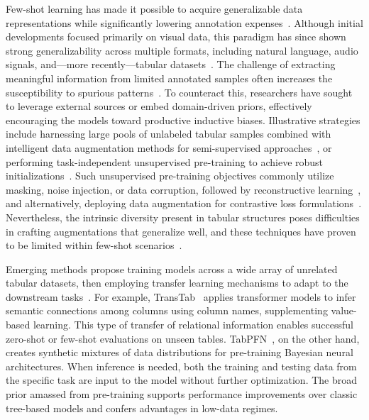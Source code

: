 Few-shot learning has made it possible to acquire generalizable data representations while significantly lowering annotation expenses~\cite{chen2018closer}. Although initial developments focused primarily on visual data, this paradigm has since shown strong generalizability across multiple formats, including natural language, audio signals, and—more recently—tabular datasets~\cite{majumder2022few,nam2023stunt,schick2021exploiting}. The challenge of extracting meaningful information from limited annotated samples often increases the susceptibility to spurious patterns~\cite{bartlett2021deep}. To counteract this, researchers have sought to leverage external sources or embed domain-driven priors, effectively encouraging the models toward productive inductive biases. Illustrative strategies include harnessing large pools of unlabeled tabular samples combined with intelligent data augmentation methods for semi-supervised approaches~\cite{ucar2021subtab,yoon2020vime}, or performing task-independent unsupervised pre-training to achieve robust initializations~\cite{somepalli2021saint}. Such unsupervised pre-training objectives commonly utilize masking, noise injection, or data corruption, followed by reconstructive learning~\cite{arik2021tabnet,majmundar2022met}, and alternatively, deploying data augmentation for contrastive loss formulations~\cite{bahri2022scarf,chen2020simple}. Nevertheless, the intrinsic diversity present in tabular structures poses difficulties in crafting augmentations that generalize well, and these techniques have proven to be limited within few-shot scenarios~\cite{nam2023stunt}.

Emerging methods propose training models across a wide array of unrelated tabular datasets, then employing transfer learning mechanisms to adapt to the downstream tasks~\cite{zhang2023generative,levin2022transfer,zhu2023xtab}. For example, TransTab~\cite{wang2022transtab} applies transformer models to infer semantic connections among columns using column names, supplementing value-based learning. This type of transfer of relational information enables successful zero-shot or few-shot evaluations on unseen tables. TabPFN~\cite{hollmann2022tabpfn}, on the other hand, creates synthetic mixtures of data distributions for pre-training Bayesian neural architectures. When inference is needed, both the training and testing data from the specific task are input to the model without further optimization. The broad prior amassed from pre-training supports performance improvements over classic tree-based models and confers advantages in low-data regimes.

